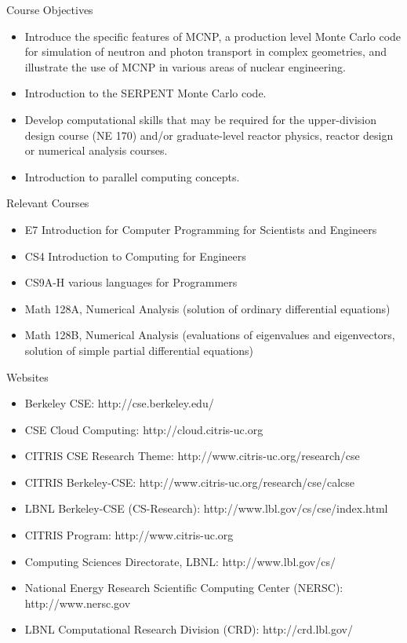 \documentclass[xcolor=x11names,compress]{beamer}
\renewcommand{\(}{\begin{columns}}
\renewcommand{\)}{\end{columns}}
\newcommand{\<}[1]{\begin{column}{#1}}
\renewcommand{\>}{\end{column}}
\begin{document}
\begin{frame}{Course Objectives}
\begin{itemize}
\item Introduce the specific features of MCNP, a production level Monte Carlo code for simulation of neutron and photon transport in complex geometries, and illustrate the use of MCNP in various areas of nuclear engineering.
\item Introduction to the SERPENT Monte Carlo code.
\item Develop computational skills that may be required for the upper-division design course (NE 170) and/or graduate-level reactor physics, reactor design or numerical analysis courses.
\item Introduction to parallel computing concepts.
\end{itemize}
\end{frame}

\begin{frame}{Relevant Courses}
\begin{itemize}
\item E7 Introduction for Computer Programming for Scientists and Engineers
\item CS4 Introduction to Computing for Engineers
\item CS9A-H various languages for Programmers
\item Math 128A, Numerical Analysis (solution of ordinary differential equations)
\item Math 128B, Numerical Analysis (evaluations of eigenvalues and eigenvectors, solution of simple partial differential equations)
\end{itemize}
\end{frame}

\begin{frame}{Websites}
\begin{itemize}
\item Berkeley CSE: http://cse.berkeley.edu/
\item CSE Cloud Computing: http://cloud.citris-uc.org
\item CITRIS CSE Research Theme: http://www.citris-uc.org/research/cse
\item CITRIS Berkeley-CSE: http://www.citris-uc.org/research/cse/calcse	
\item LBNL Berkeley-CSE (CS-Research):  http://www.lbl.gov/cs/cse/index.html
\item CITRIS Program: http://www.citris-uc.org
\item Computing Sciences Directorate, LBNL: http://www.lbl.gov/cs/
\item National Energy Research Scientific Computing Center (NERSC): http://www.nersc.gov	
\item LBNL Computational Research Division (CRD): http://crd.lbl.gov/
\end{itemize}
\end{frame}
\end{document}
